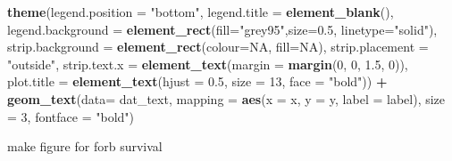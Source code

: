 \documentclass[
]{article}
\newenvironment{Shaded}{\begin{snugshade}}{\end{snugshade}}
\newcommand{\DataTypeTok}[1]{\textcolor[rgb]{0.13,0.29,0.53}{#1}}
\newcommand{\DecValTok}[1]{\textcolor[rgb]{0.00,0.00,0.81}{#1}}
\newcommand{\FloatTok}[1]{\textcolor[rgb]{0.00,0.00,0.81}{#1}}
\newcommand{\KeywordTok}[1]{\textcolor[rgb]{0.13,0.29,0.53}{\textbf{#1}}}
\newcommand{\NormalTok}[1]{#1}
\newcommand{\OperatorTok}[1]{\textcolor[rgb]{0.81,0.36,0.00}{\textbf{#1}}}
\newcommand{\OtherTok}[1]{\textcolor[rgb]{0.56,0.35,0.01}{#1}}
\newcommand{\StringTok}[1]{\textcolor[rgb]{0.31,0.60,0.02}{#1}}
\begin{document}
\begin{Shaded}
\begin{Highlighting}[]
\StringTok{  }\KeywordTok{theme}\NormalTok{(}\DataTypeTok{legend.position =} \StringTok{"bottom"}\NormalTok{, }\DataTypeTok{legend.title =} \KeywordTok{element\_blank}\NormalTok{(), }\DataTypeTok{legend.background =} \KeywordTok{element\_rect}\NormalTok{(}\DataTypeTok{fill=}\StringTok{"grey95"}\NormalTok{,}\DataTypeTok{size=}\FloatTok{0.5}\NormalTok{, }\DataTypeTok{linetype=}\StringTok{"solid"}\NormalTok{), }\DataTypeTok{strip.background =} \KeywordTok{element\_rect}\NormalTok{(}\DataTypeTok{colour=}\OtherTok{NA}\NormalTok{, }\DataTypeTok{fill=}\OtherTok{NA}\NormalTok{), }\DataTypeTok{strip.placement =} \StringTok{"outside"}\NormalTok{, }\DataTypeTok{strip.text.x =} \KeywordTok{element\_text}\NormalTok{(}\DataTypeTok{margin =} \KeywordTok{margin}\NormalTok{(}\DecValTok{0}\NormalTok{, }\DecValTok{0}\NormalTok{, }\FloatTok{1.5}\NormalTok{, }\DecValTok{0}\NormalTok{)), }\DataTypeTok{plot.title =} \KeywordTok{element\_text}\NormalTok{(}\DataTypeTok{hjust =} \FloatTok{0.5}\NormalTok{, }\DataTypeTok{size =} \DecValTok{13}\NormalTok{, }\DataTypeTok{face =} \StringTok{"bold"}\NormalTok{)) }\OperatorTok{+}
\StringTok{  }\KeywordTok{geom\_text}\NormalTok{(}\DataTypeTok{data=}\NormalTok{ dat\_text, }\DataTypeTok{mapping =} \KeywordTok{aes}\NormalTok{(}\DataTypeTok{x =}\NormalTok{ x, }\DataTypeTok{y =}\NormalTok{ y, }\DataTypeTok{label =}\NormalTok{ label), }\DataTypeTok{size =} \DecValTok{3}\NormalTok{, }\DataTypeTok{fontface =} \StringTok{"bold"}\NormalTok{)}
\end{Highlighting}
\end{Shaded}

make figure for forb survival
\end{document}
